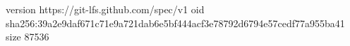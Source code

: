 version https://git-lfs.github.com/spec/v1
oid sha256:39a2e9daf671c71e9a721dab6e5bf444acf3e78792d6794e57cedf77a955ba41
size 87536
